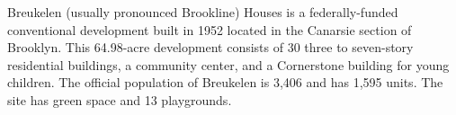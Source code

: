  

Breukelen (usually pronounced Brookline) Houses is a federally-funded conventional development built in 1952 located in the Canarsie section of Brooklyn. This 64.98-acre development consists of 30 three to seven-story residential buildings, a community center, and a Cornerstone building for young children. The official population of Breukelen is 3,406 and has 1,595 units. The site has green space and 13 playgrounds. 